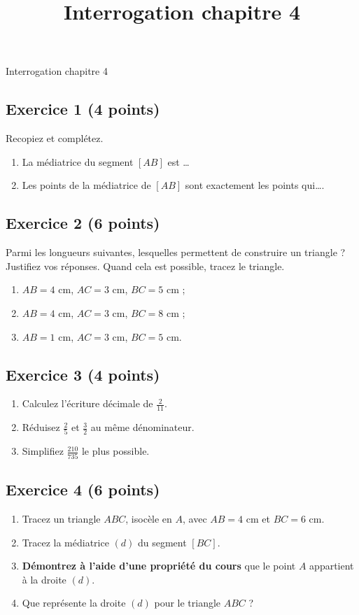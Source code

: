 \documentclass[14 pt]{extarticle}
\title{Interrogation chapitre 4}
\date{}
\theoremstyle{plain}
\begin{document}
\begin{center}{\Large Interrogation chapitre 4}\\ 
 \end{center}
 
 
 \subsection*{Exercice 1 (4 points)}
 Recopiez et complétez. 
 \begin{enumerate}
 \item La médiatrice du segment $[AB]$ est \ldots
 \item Les points de la médiatrice de $[AB]$ sont exactement les points qui\ldots. 
 \end{enumerate}
 
 \subsection*{Exercice 2 (6 points)}
 
Parmi les longueurs suivantes, lesquelles permettent de construire un triangle ? Justifiez vos réponses. Quand cela est possible, tracez le triangle.
\begin{enumerate}
\item $AB = 4$ cm, $AC = 3$ cm, $BC = 5$ cm ;
\item $AB = 4$ cm, $AC = 3$ cm, $BC = 8$ cm ;
\item $AB = 1$ cm, $AC = 3$ cm, $BC = 5$ cm. 
\end{enumerate}


\subsection*{Exercice 3 (4 points)}
\begin{enumerate}
\item Calculez l'écriture décimale de $\frac2{11}$. 
\item Réduisez $\frac25$ et $\frac32$ au même dénominateur. 
\item Simplifiez $\frac{210}{735}$ le plus possible. 
\end{enumerate}


\subsection*{Exercice 4 (6 points)}
\begin{enumerate}
\item Tracez un triangle $ABC$, isocèle en $A$, avec $AB = 4$ cm et $BC = 6$ cm. 
\item Tracez la médiatrice $(d)$ du segment $[BC]$. 
\item \textbf{Démontrez à l'aide d'une propriété du cours} que le point $A$ appartient à la droite $(d)$. 
\item Que représente la droite $(d)$ pour le triangle $ABC$ ?
\end{enumerate}
\end{document}
